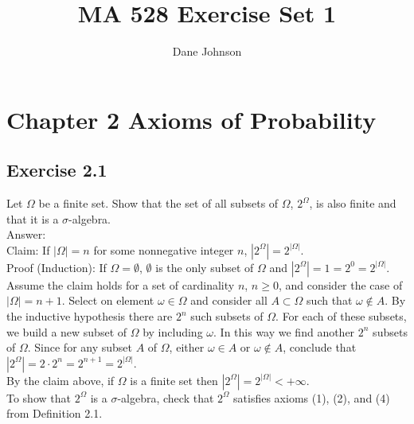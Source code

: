 \documentclass{article}
\title{MA 528 Exercise Set 1}
\author{Dane Johnson}
\begin{document}
\maketitle

\section*{Chapter 2 Axioms of Probability}

\subsection*{Exercise 2.1}

Let $\Omega$ be a finite set. Show that the set of all subsets of $\Omega$, $2^\Omega$, is also
finite and that it is a $\sigma$-algebra.\\

Answer:\\

Claim: If $|\Omega| = n$ for some nonnegative integer $n$, $|2^\Omega| = 2^{|\Omega|}$.\\

Proof (Induction): If $\Omega = \emptyset$, $\emptyset$ is the only subset of $\Omega$ and $|2^\Omega| = 1 = 2^0 = 2^{|\Omega|}$. Assume the claim holds for a set of cardinality $n$, $n \geq 0$, and consider the case of $|\Omega| = n+1$. Select on element $\omega \in \Omega$ and consider all $A \subset \Omega$ such that $\omega \notin A$. By the inductive hypothesis there are $2^n$ such subsets of $\Omega$. For each of these subsets, we build a new subset of $\Omega$ by including $\omega$. In this way we find another $2^n$ subsets of $\Omega$. Since for any subset $A$ of $\Omega$, either $\omega \in A$ or $\omega \notin A$, conclude that $|2^\Omega| = 2\cdot 2^n = 2^{n+1} = 2^{|\Omega|}$. \\

By the claim above, if $\Omega$ is a finite set then $|2^\Omega| = 2^{|\Omega|} < +\infty$. \\

To show that $2^\Omega$ is a $\sigma$-algebra, check that $2^\Omega$ satisfies axioms (1), (2), and (4) from Definition 2.1.
\end{document}
